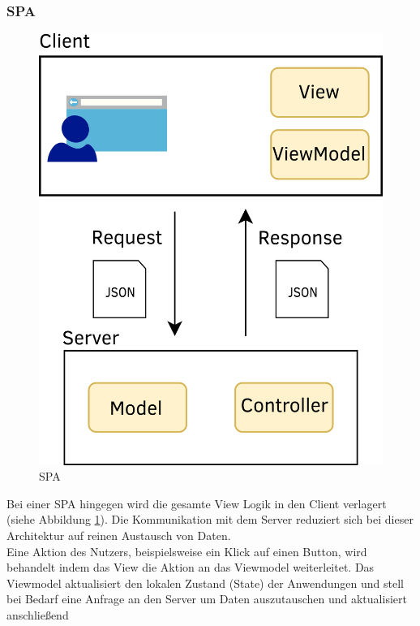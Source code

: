 \subsubsection{\acl{SPA}}
\begin{figure}
  \begin{center}
    \includegraphics[scale=1.5]{images/spa_web_app.png}
  \end{center}
  \caption{\acl{SPA}}
  \label{fig:spaweb}
\end{figure}
Bei einer \ac{SPA} hingegen wird die gesamte View Logik in den Client verlagert
(siehe Abbildung \ref{fig:spaweb}). Die Kommunikation mit dem Server reduziert
sich bei dieser Architektur auf reinen Austausch von Daten.\\
Eine Aktion des Nutzers, beispielsweise ein Klick auf einen Button, wird behandelt indem das
View die Aktion an das Viewmodel weiterleitet. Das Viewmodel aktualisiert den
lokalen Zustand (State) der Anwendungen und stell bei Bedarf eine Anfrage an den Server um Daten auszutauschen und aktualisiert anschließend
